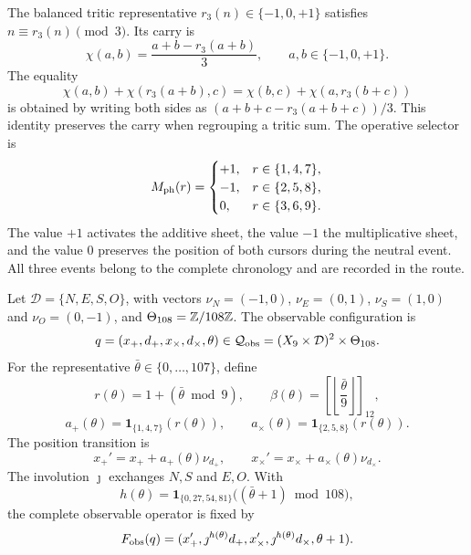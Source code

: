 The balanced tritic representative \(r_3(n)\in\{-1,0,+1\}\) satisfies
\(n\equiv r_3(n)\pmod3\). Its carry is
\[
 \chi(a,b)=\frac{a+b-r_3(a+b)}3,\qquad
 a,b\in\{-1,0,+1\}.
\]
The equality
\[
 \chi(a,b)+\chi(r_3(a+b),c)
 =\chi(b,c)+\chi(a,r_3(b+c))
\]
is obtained by writing both sides as
\((a+b+c-r_3(a+b+c))/3\). This identity preserves the carry when regrouping a tritic sum. The operative selector is
\[
 M_{\rm ph}(r)=
 \begin{cases}
 +1,&r\in\{1,4,7\},\\
 -1,&r\in\{2,5,8\},\\
 0,&r\in\{3,6,9\}.
 \end{cases}
\]
The value \(+1\) activates the additive sheet, the value \(-1\) the multiplicative sheet, and the value \(0\) preserves the position of both cursors during the neutral event. All three events belong to the complete chronology and are recorded in the route.

Let \(\mathcal D=\{N,E,S,O\}\), with vectors
\(\nu_N=(-1,0)\), \(\nu_E=(0,1)\), \(\nu_S=(1,0)\) and
\(\nu_O=(0,-1)\), and \(\Theta_{108}=\mathbb Z/108\mathbb Z\). The observable configuration is
\[
 q=(x_+,d_+,x_\times,d_\times,\theta)
 \in\mathcal Q_{\rm obs}=(X_9\times\mathcal D)^2\times\Theta_{108}.
\]
For the representative \(\bar\theta\in\{0,\ldots,107\}\), define
\[
 r(\theta)=1+(\bar\theta\bmod9),\qquad
 \beta(\theta)=\left[\left\lfloor\frac{\bar\theta}{9}\right\rfloor\right]_{12},
\]
\[
 a_+(\theta)=\mathbf1_{\{1,4,7\}}(r(\theta)),\qquad
 a_\times(\theta)=\mathbf1_{\{2,5,8\}}(r(\theta)).
\]
The position transition is
\[
 x_+'=x_++a_+(\theta)\nu_{d_+},\qquad
 x_\times'=x_\times+a_\times(\theta)\nu_{d_\times}.
\]
The involution \(\jmath\) exchanges \(N,S\) and \(E,O\). With
\[
 h(\theta)=\mathbf1_{\{0,27,54,81\}}\bigl((\bar\theta+1)\bmod108\bigr),
\]
the complete observable operator is fixed by
\[
 F_{\rm obs}(q)=
 (x_+',\jmath^{h(\theta)}d_+,x_\times',
   \jmath^{h(\theta)}d_\times,\theta+1).
\]

